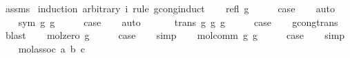 \begin{isabellebody}
\ assms\isanewline
{}\isamarkupfalse%
\ {\isacharparenleft}{\kern0pt}induction\ arbitrary{\isacharcolon}{\kern0pt}\ i\ rule{\isacharcolon}{\kern0pt}\ gcong{\isachardot}{\kern0pt}induct{\isacharparenright}{\kern0pt}\isanewline
\ \ \isamarkupfalse%
\ {\isacharparenleft}{\kern0pt}refl\ g{\isacharparenright}{\kern0pt}\isanewline
\ \ \isamarkupfalse%
\ \isamarkupfalse%
\ {\isacharquery}{\kern0pt}case\isanewline
\ \ \isamarkupfalse%
\ auto\isanewline
\ \ \isamarkupfalse%
\isanewline
{}\isamarkupfalse%
\isanewline
\ \ \isamarkupfalse%
\ {\isacharparenleft}{\kern0pt}sym\ g{}\ g{}{\isacharparenright}{\kern0pt}\isanewline
\ \ \isamarkupfalse%
\ \isamarkupfalse%
\ {\isacharquery}{\kern0pt}case\isanewline
\ \ \isamarkupfalse%
\ auto\isanewline
\ \ \isamarkupfalse%
\isanewline
{}\isamarkupfalse%
\isanewline
\ \ \isamarkupfalse%
\ {\isacharparenleft}{\kern0pt}trans\ g{}\ g{}\ g{}{\isacharparenright}{\kern0pt}\isanewline
\ \ \isamarkupfalse%
\ \isamarkupfalse%
\ {\isacharquery}{\kern0pt}case\isanewline
\ \ \isamarkupfalse%
\ gcong{\isachardot}{\kern0pt}trans\ \isamarkupfalse%
\ blast\isanewline
{}\isamarkupfalse%
\isanewline
\ \ \isamarkupfalse%
\ {\isacharparenleft}{\kern0pt}mol{\isacharunderscore}{\kern0pt}zero\ g{\isacharparenright}{\kern0pt}\isanewline
\ \ \isamarkupfalse%
\ \isamarkupfalse%
\ {\isacharquery}{\kern0pt}case\isanewline
\ \ \isamarkupfalse%
\ simp\isanewline
{}\isamarkupfalse%
\isanewline
\ \ \isamarkupfalse%
\ {\isacharparenleft}{\kern0pt}mol{\isacharunderscore}{\kern0pt}comm\ g{}\ g{}{\isacharparenright}{\kern0pt}\isanewline
\ \ \isamarkupfalse%
\ \isamarkupfalse%
\ {\isacharquery}{\kern0pt}case\isanewline
\ \ \isamarkupfalse%
\ simp\isanewline
{}\isamarkupfalse%
\isanewline
\ \ \isamarkupfalse%
\ {\isacharparenleft}{\kern0pt}mol{\isacharunderscore}{\kern0pt}assoc\ a\ b\ c{\isacharparenright}{\kern0pt}\isanewline
\ \ \isamarkupfalse%
\ \isamarkupfalse%

\end{isabellebody}
